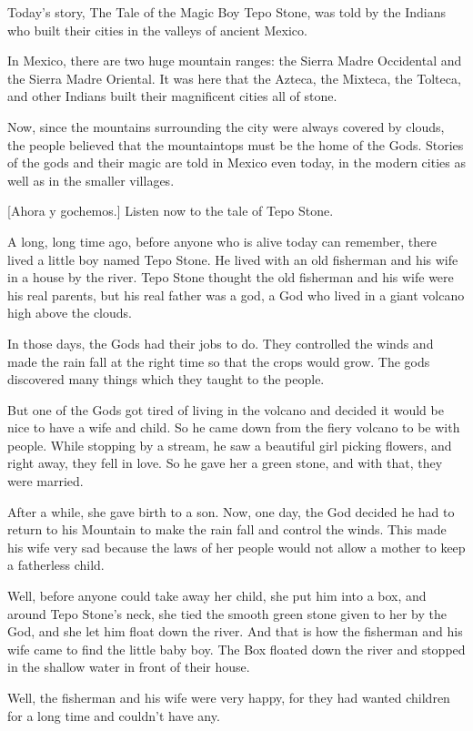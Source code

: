 Today's story, The Tale of the Magic Boy Tepo Stone, was told by the Indians who built their cities in the valleys of ancient Mexico.

In Mexico, there are two huge mountain ranges: the Sierra Madre Occidental and the Sierra Madre Oriental. It was here that the Azteca, the Mixteca, the Tolteca, and other Indians built their magnificent cities all of stone.

Now, since the mountains surrounding the city were always covered by clouds, the people believed that the mountaintops must be the home of the Gods. Stories of the gods and their magic are told in Mexico even today, in the modern cities as well as in the smaller villages.

    [Ahora y gochemos.] Listen now to the tale of Tepo Stone.

A long, long time ago, before anyone who is alive today can remember, there lived a little boy named Tepo Stone. He lived with an old fisherman and his wife in a house by the river. Tepo Stone thought the old fisherman and his wife were his real parents, but his real father was a god, a God who lived in a giant volcano high above the clouds.

In those days, the Gods had their jobs to do. They controlled the winds and made the rain fall at the right time so that the crops would grow. The gods discovered many things which they taught to the people.

But one of the Gods got tired of living in the volcano and decided it would be nice to have a wife and child. So he came down from the fiery volcano to be with people. While stopping by a stream, he saw a beautiful girl picking flowers, and right away, they fell in love. So he gave her a green stone, and with that, they were married.

After a while, she gave birth to a son. Now, one day, the God decided he had to return to his Mountain to make the rain fall and control the winds. This made his wife very sad because the laws of her people would not allow a mother to keep a fatherless child.

Well, before anyone could take away her child, she put him into a box, and around Tepo Stone's neck, she tied the smooth green stone given to her by the God, and she let him float down the river. And that is how the fisherman and his wife came to find the little baby boy. The Box floated down the river and stopped in the shallow water in front of their house.

Well, the fisherman and his wife were very happy, for they had wanted children for a long time and couldn't have any.

